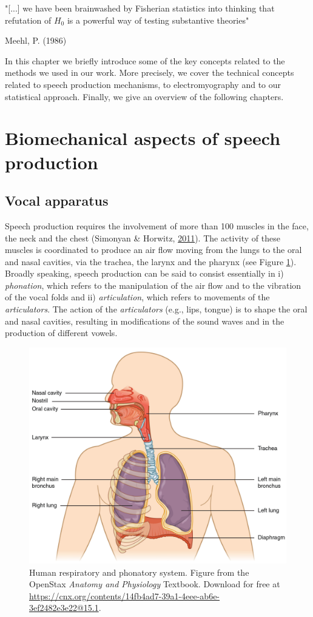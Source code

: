\documentclass[a4paper,12pt,twoside,openright,oldfontcommands,final]{memoir}
\newcommand{\initial}[1]{
	\lettrine[lines=3,lhang=0.33,nindent=0em]{
		\color{gray}
     		{\textsc{#1}}}{}}
\begin{document}
\epigraph{"[...] we have been brainwashed by Fisherian statistics into thinking that refutation of $H_{0}$ is a powerful way of testing substantive theories"}{Meehl, P. (1986)}

\initial{I}n this chapter we briefly introduce some of the key concepts related to the methods we used in our work. More precisely, we cover the technical concepts related to speech production mechanisms, to electromyography and to our statistical approach. Finally, we give an overview of the following chapters.

\hypertarget{biomechanical-aspects-of-speech-production}{%
\section{Biomechanical aspects of speech production}\label{biomechanical-aspects-of-speech-production}}

\hypertarget{vocal-apparatus}{%
\subsection{Vocal apparatus}\label{vocal-apparatus}}

Speech production requires the involvement of more than 100 muscles in the face, the neck and the chest (Simonyan \& Horwitz, \protect\hyperlink{ref-simonyan_laryngeal_2011}{2011}). The activity of these muscles is coordinated to produce an air flow moving from the lungs to the oral and nasal cavities, via the trachea, the larynx and the pharynx (see Figure \ref{fig:vocal}). Broadly speaking, speech production can be said to consist essentially in i) \emph{phonation}, which refers to the manipulation of the air flow and to the vibration of the vocal folds and ii) \emph{articulation}, which refers to movements of the \emph{articulators}. The action of the \emph{articulators} (e.g., lips, tongue) is to shape the oral and nasal cavities, resulting in modifications of the sound waves and in the production of different vowels.

\begin{figure}

{\centering \includegraphics[width=0.5\linewidth]{assets/vocal} 

}

\caption{Human respiratory and phonatory system. Figure from the OpenStax \textit{Anatomy and Physiology} Textbook. Download for free at \url{https://cnx.org/contents/14fb4ad7-39a1-4eee-ab6e-3ef2482e3e22@15.1}.}\label{fig:vocal}
\end{figure}
\end{document}
